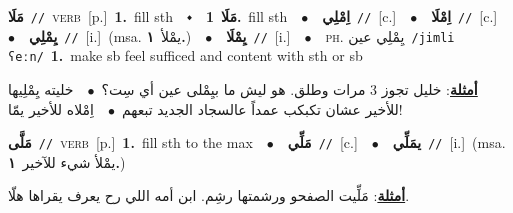 \documentclass[10pt,a4paper,twoside]{article} %
\begin{document}
\begin{multicols}{2}
{\setlength\topsep{0pt}\textbf{\foreignlanguage{arabic}{مَلَا}}\ {\color{gray}\texttt{//}\color{black}}\ \textsc{verb}\ [p.]\ \textbf{1.}~fill sth\ \ $\smblkdiamond$\ \ \setlength\topsep{0pt}\textbf{\foreignlanguage{arabic}{مَلَا}}\ \textbf{1.}~fill sth\ \ $\bullet$\ \ \setlength\topsep{0pt}\textbf{\foreignlanguage{arabic}{اِمْلِي}}\ {\color{gray}\texttt{//}\color{black}}\ [c.]\ \ $\bullet$\ \ \setlength\topsep{0pt}\textbf{\foreignlanguage{arabic}{اِمْلَا}}\ {\color{gray}\texttt{//}\color{black}}\ [c.]\ \ $\bullet$\ \ \setlength\topsep{0pt}\textbf{\foreignlanguage{arabic}{يِمْلِي}}\ {\color{gray}\texttt{//}\color{black}}\ [i.]\ \color{gray}(msa. \foreignlanguage{arabic}{يمْلأ}~\foreignlanguage{arabic}{\textbf{١.}})\color{black}\ \ $\bullet$\ \ \setlength\topsep{0pt}\textbf{\foreignlanguage{arabic}{يِمْلَا}}\ {\color{gray}\texttt{//}\color{black}}\ [i.]\ \ $\bullet$\ \ \textsc{ph.} \color{gray} \foreignlanguage{arabic}{يِمْلِي عين}\color{black}\ {\color{gray}\texttt{/{\sffamily jimli ʕeːn}/}\color{black}}\ \textbf{1.}~make sb feel sufficed and content with sth or sb\  \begin{flushright}\color{gray}\foreignlanguage{arabic}{\textbf{\underline{\foreignlanguage{arabic}{أمثلة}}}: خليل تجوز 3 مرات وطلق. هو ليش ما بيِمْلى عين أي سِت؟\ $\bullet$\ \  خليته يِمْلِيها للأخير عشان تكبكب عمداً عالسجاد الجديد تبعهم\ $\bullet$\ \  اِمْلاه للأخير يمّا!}\end{flushright}\color{black}} \vspace{2mm}

{\setlength\topsep{0pt}\textbf{\foreignlanguage{arabic}{مَلَّى}}\ {\color{gray}\texttt{//}\color{black}}\ \textsc{verb}\ [p.]\ \textbf{1.}~fill sth to the max\ \ $\bullet$\ \ \setlength\topsep{0pt}\textbf{\foreignlanguage{arabic}{مَلِّي}}\ {\color{gray}\texttt{//}\color{black}}\ [c.]\ \ $\bullet$\ \ \setlength\topsep{0pt}\textbf{\foreignlanguage{arabic}{يمَلِّي}}\ {\color{gray}\texttt{//}\color{black}}\ [i.]\ \color{gray}(msa. \foreignlanguage{arabic}{يمْلأ شيء للآخير}~\foreignlanguage{arabic}{\textbf{١.}})\color{black}\  \begin{flushright}\color{gray}\foreignlanguage{arabic}{\textbf{\underline{\foreignlanguage{arabic}{أمثلة}}}: مَلِّيت الصفحو ورشمتها رشِم. ابن أمه اللي رح يعرف يقراها هلّا.}\end{flushright}\color{black}} \vspace{2mm}


\end{multicols}
\end{document}
